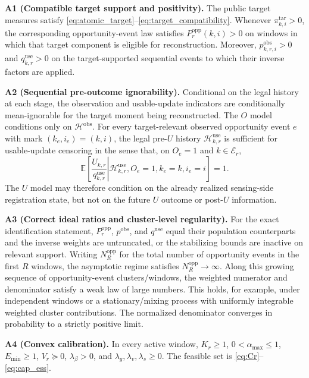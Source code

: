 \documentclass[letterpaper,journal]{IEEEtran}
\begin{document}
\noindent\textbf{A1 (Compatible target support and positivity).}
The public target measures satisfy
\eqref{eq:atomic_target}--\eqref{eq:target_compatibility}.  Whenever
$\pi^{\mathrm{tar}}_{k,i}>0$, the corresponding opportunity-event law satisfies
$P_r^{\mathrm{opp}}(k,i)>0$ on windows in which that target component is
eligible for reconstruction.  Moreover,
$p^{\mathrm{obs}}_{k,r,i}>0$ and $q^{\mathrm{use}}_{k,r}>0$ on the
target-supported sequential events to which their inverse factors are applied.

\noindent\textbf{A2 (Sequential pre-outcome ignorability).}
Conditional on the legal history at each stage, the observation and
usable-update indicators are conditionally mean-ignorable for the target moment
being reconstructed.  The $O$ model conditions only on
$\mathcal{H}^{\mathrm{obs}}$.  For every target-relevant observed opportunity
event $e$ with mark $(k_e,i_e)=(k,i)$, the legal pre-$U$ history
$\mathcal{H}^{\mathrm{use}}_{k,r}$ is sufficient for usable-update censoring in
the sense that, on $O_e=1$ and $k\in\mathcal{E}_r$,
\begin{equation}
 \mathbb{E}\!\left[
 \left.
 \frac{U_{k,r}}{q^{\mathrm{use}}_{k,r}}
 \right|
 \mathcal{H}^{\mathrm{use}}_{k,r},
 O_e=1,k_e=k,i_e=i
 \right]
 =1.
 \label{eq:A2_use_mean_ignorability}
\end{equation}
The $U$ model may therefore condition on the already realized sensing-side
registration state, but not on the future $U$ outcome or post-$U$ information.

\noindent\textbf{A3 (Correct ideal ratios and cluster-level regularity).}
For the exact identification statement,
$P_r^{\mathrm{opp}}$, $p^{\mathrm{obs}}$, and $q^{\mathrm{use}}$ equal their
population counterparts and the inverse weights are untruncated, or the
stabilizing bounds are inactive on relevant support.  Writing
$N_R^{\mathrm{opp}}$ for the total number of opportunity events in the first
$R$ windows, the asymptotic regime satisfies
$N_R^{\mathrm{opp}}\rightarrow\infty$.  Along this growing sequence of
opportunity-event clusters/windows, the weighted numerator and denominator
satisfy a weak law of large numbers.  This holds, for example, under
independent windows or a stationary/mixing process with uniformly integrable
weighted cluster contributions.  The normalized denominator converges in
probability to a strictly positive limit.

\noindent\textbf{A4 (Convex calibration).}
In every active window, $K_r\ge1$, $0<\alpha_{\max}\le1$, $E_{\min}\ge1$,
$V_r\succeq0$, $\lambda_{\beta}>0$, and
$\lambda_g,\lambda_v,\lambda_s\ge0$.  The feasible set is
\eqref{eq:Cr}--\eqref{eq:cap_ess}.
\end{document}
